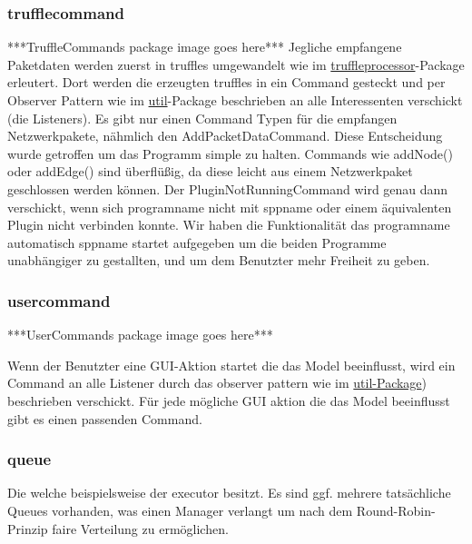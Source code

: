       \subsubsection{trufflecommand}
      \label{subsubsec:trufflecommand}
      ***TruffleCommands package image goes here***
      \newline
      \newline
      Jegliche empfangene Paketdaten werden zuerst in \glspl{truffle} umgewandelt wie
      im \hyperref[subsubsec:truffleprocessor]{truffleprocessor}-Package erleutert. Dort
      werden die erzeugten \glspl{truffle} in ein Command gesteckt und per Observer Pattern
      wie im \hyperref[subsec:util]{util}-Package beschrieben an alle In­te­r­es­senten verschickt
      (die Listeners).
      \newline
      \newline
      Es gibt nur einen Command Typen für die empfangen Netzwerkpakete, nähmlich den
      AddPacketDataCommand. Diese Entscheidung wurde getroffen um das Programm simple
      zu halten. Commands wie addNode() oder addEdge() sind überflüßig, da diese leicht aus
      einem Netzwerkpaket geschlossen werden können.
      \newline
      \newline
      Der PluginNotRunningCommand wird genau dann verschickt, wenn sich \gls{programname}
      nicht mit \gls{sppname} oder einem äquivalenten Plugin nicht verbinden konnte. Wir
      haben die Funktionalität das \gls{programname} automatisch \gls{sppname} startet
      aufgegeben um die beiden Programme unabhängiger zu gestallten, und um dem Benutzter
      mehr Freiheit zu geben.

      \subsubsection{usercommand}
      \label{subsubsec:usercommand}
      ***UserCommands package image goes here***
      \newline
      \newline

      Wenn der Benutzter eine GUI-Aktion startet die das Model beeinflusst,
      wird ein Command an alle Listener durch das observer pattern wie im
      \hyperref[subsec:util]{util-Package}) beschrieben verschickt. Für jede mögliche
      GUI aktion die das Model beeinflusst gibt es einen passenden Command.

      \subsubsection{queue}
      \label{subsubsec:queue}
      Die  welche beispielsweise der executor besitzt. Es
      sind ggf. mehrere tatsächliche Queues vorhanden, was einen Manager verlangt
      um nach dem Round-Robin-Prinzip faire Verteilung zu ermöglichen.

